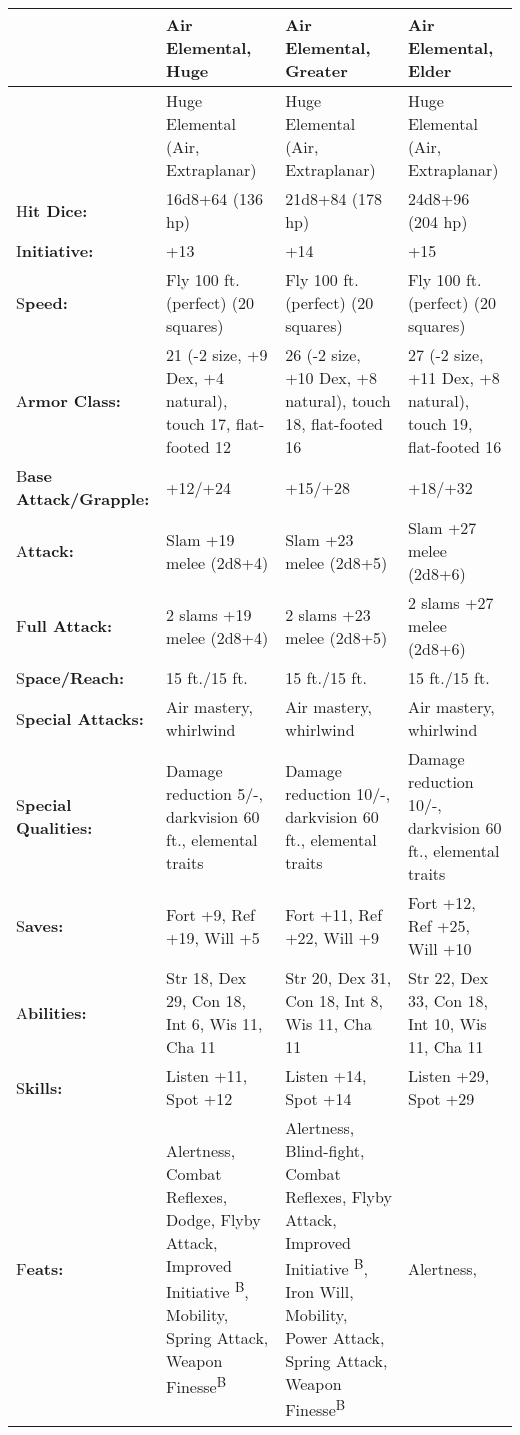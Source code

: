 \documentclass{article}
\begin{document}
\vspace{12pt}
\begin{tabular}{|>{\raggedright}p{49pt}|>{\raggedright}p{74pt}|>{\raggedright}p{87pt}|>{\raggedright}p{91pt}|}
\hline
  & A\textbf{ir Elemental, Huge} & A\textbf{ir Elemental, Greater} & A\textbf{ir 
Elemental, Elder}\tabularnewline
\hline
  & Huge Elemental {\small{}(Air, Extraplanar)} & Huge Elemental {\small{}(Air, 
Extraplanar)} & Huge Elemental {\small{}(Air, Extraplanar)}\tabularnewline
\hline
H\textbf{it Dice:} & 16d8+64 (136 hp) & 21d8+84 (178 hp) & 24d8+96 (204 hp)\tabularnewline
\hline
I\textbf{nitiative:} & +13 & +14 & +15\tabularnewline
\hline
S\textbf{peed:} & Fly 100 ft. (perfect) (20 squares) & Fly 100 ft. (perfect) (20 
squares) & Fly 100 ft. (perfect) (20 squares)\tabularnewline
\hline
A\textbf{rmor Class:} & 21 (-2 size, +9 Dex, +4 natural), touch 17, flat-footed 
12 & 26 (-2 size, +10 Dex, +8 natural), touch 18, flat-footed 16 & 27 (-2 size, 
+11 Dex, +8 natural), touch 19, flat-footed 16\tabularnewline
\hline
B\textbf{ase Attack/Grapple:} & +12/+24 & +15/+28 & +18/+32\tabularnewline
\hline
A\textbf{ttack:} & Slam +19 melee (2d8+4) & Slam +23 melee (2d8+5) & Slam +27 melee 
(2d8+6)\tabularnewline
\hline
F\textbf{ull Attack:} & 2 slams +19 melee (2d8+4) & 2 slams +23 melee (2d8+5) & 2 
slams +27 melee (2d8+6)\tabularnewline
\hline
S\textbf{pace/Reach:} & 15 ft./15 ft. & 15 ft./15 ft. & 15 ft./15 ft.\tabularnewline
\hline
S\textbf{pecial Attacks:} & Air mastery, whirlwind & Air mastery, whirlwind & Air 
mastery, whirlwind\tabularnewline
\hline
S\textbf{pecial Qualities:} & Damage reduction 5/-, darkvision 60 ft., elemental 
traits & Damage reduction 10/-, darkvision 60 ft., elemental traits & Damage reduction 
10/-, darkvision 60 ft., elemental traits\tabularnewline
\hline
S\textbf{aves:} & Fort +9, Ref +19, Will +5 & Fort +11, Ref +22, Will +9 & Fort 
+12, Ref +25, Will +10\tabularnewline
\hline
A\textbf{bilities:} & Str 18, Dex 29, Con 18, Int 6, Wis 11, Cha 11 & Str 20, Dex 
31, Con 18, Int 8, Wis 11, Cha 11 & Str 22, Dex 33, Con 18, Int 10, Wis 11, Cha 
11\tabularnewline
\hline
S\textbf{kills:} & Listen +11, Spot +12 & Listen +14, Spot +14 & Listen +29, Spot 
+29\tabularnewline
\hline
F\textbf{eats:} & Alertness, Combat Reflexes, Dodge, Flyby Attack, Improved Initiative 
\textsuperscript{B}, Mobility, Spring Attack, Weapon Finesse\textsuperscript{B} & Alertness, 
Blind-fight, Combat Reflexes, Flyby Attack, Improved Initiative \textsuperscript{B}, 
Iron Will, Mobility, Power Attack, Spring Attack, Weapon Finesse\textsuperscript{B} & Alertness, 

\end{tabular}
\end{document}

